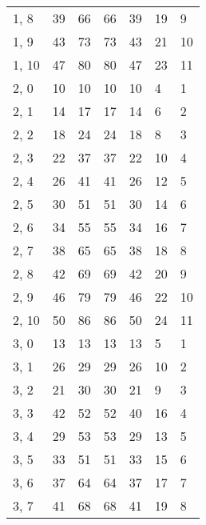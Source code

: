 \begin{table}
\begin{tabular}{lllllll}
1, 8   &         39 &          66 &        66 &          39 &       19 &     9 \\
1, 9   &         43 &          73 &        73 &          43 &       21 &    10 \\
1, 10  &         47 &          80 &        80 &          47 &       23 &    11 \\
2, 0   &         10 &          10 &        10 &          10 &        4 &     1 \\
2, 1   &         14 &          17 &        17 &          14 &        6 &     2 \\
2, 2   &         18 &          24 &        24 &          18 &        8 &     3 \\
2, 3   &         22 &          37 &        37 &          22 &       10 &     4 \\
2, 4   &         26 &          41 &        41 &          26 &       12 &     5 \\
2, 5   &         30 &          51 &        51 &          30 &       14 &     6 \\
2, 6   &         34 &          55 &        55 &          34 &       16 &     7 \\
2, 7   &         38 &          65 &        65 &          38 &       18 &     8 \\
2, 8   &         42 &          69 &        69 &          42 &       20 &     9 \\
2, 9   &         46 &          79 &        79 &          46 &       22 &    10 \\
2, 10  &         50 &          86 &        86 &          50 &       24 &    11 \\
3, 0   &         13 &          13 &        13 &          13 &        5 &     1 \\
3, 1   &         26 &          29 &        29 &          26 &       10 &     2 \\
3, 2   &         21 &          30 &        30 &          21 &        9 &     3 \\
3, 3   &         42 &          52 &        52 &          40 &       16 &     4 \\
3, 4   &         29 &          53 &        53 &          29 &       13 &     5 \\
3, 5   &         33 &          51 &        51 &          33 &       15 &     6 \\
3, 6   &         37 &          64 &        64 &          37 &       17 &     7 \\
3, 7   &         41 &          68 &        68 &          41 &       19 &     8 \\

\end{tabular}
\end{table}
